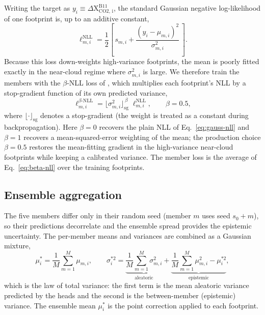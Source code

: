 Writing the target as $y_i \equiv \Delta \mathrm{X_{CO2,\,i}^{B11}}$, the standard
Gaussian negative log-likelihood of one footprint is, up to an additive constant,
%
\begin{equation}
  \ell^{\mathrm{NLL}}_{m,i}
  = \frac{1}{2}\left[\,s_{m,i}
  + \frac{(y_i-\mu_{m,i})^{2}}{\sigma_{m,i}^{2}}\,\right].
  \label{eq:gauss-nll}
\end{equation}
%
Because this loss down-weights high-variance footprints, the mean is poorly
fitted exactly in the near-cloud regime where $\sigma_{m,i}^{2}$ is large. We
therefore train the members with the $\beta$-NLL loss of
\citet{seitzer2022pitfalls}, which multiplies each footprint's NLL by a
stop-gradient function of its own predicted variance,
%
\begin{equation}
  \ell^{\beta\text{-}\mathrm{NLL}}_{m,i}
  = \bigl\lfloor\sigma_{m,i}^{2}\bigr\rfloor_{\mathrm{sg}}^{\,\beta}\;
  \ell^{\mathrm{NLL}}_{m,i},
  \qquad \beta = 0.5,
  \label{eq:beta-nll}
\end{equation}
%
where $\lfloor\cdot\rfloor_{\mathrm{sg}}$ denotes a stop-gradient (the weight is
treated as a constant during backpropagation). Here $\beta = 0$ recovers the
plain NLL of Eq.~\eqref{eq:gauss-nll} and $\beta = 1$ recovers a
mean-squared-error weighting of the mean; the production choice $\beta = 0.5$
restores the mean-fitting gradient in the high-variance near-cloud footprints
while keeping a calibrated variance. The member loss is the average of
Eq.~\eqref{eq:beta-nll} over the training footprints.

\subsection{Ensemble aggregation}

The five members differ only in their random seed (member $m$ uses seed
$s_0 + m$), so their predictions decorrelate and the ensemble spread provides
the epistemic uncertainty. The per-member means and variances are combined as a
Gaussian mixture,
%
\begin{equation}
  \mu^{*}_i = \frac{1}{M}\sum_{m=1}^{M}\mu_{m,i},
  \qquad
  \sigma^{*2}_i
  = \underbrace{\frac{1}{M}\sum_{m=1}^{M}\sigma_{m,i}^{2}}_{\text{aleatoric}}
  + \underbrace{\frac{1}{M}\sum_{m=1}^{M}\mu_{m,i}^{2} - \mu^{*2}_i}_{\text{epistemic}},
  \label{eq:mixture}
\end{equation}
%
which is the law of total variance: the first term is the mean aleatoric
variance predicted by the heads and the second is the between-member (epistemic)
variance. The ensemble mean $\mu^{*}_i$ is the point correction applied to each
footprint.

